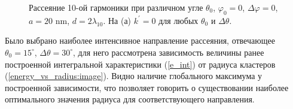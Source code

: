 
    \begin{figure}[H]
        \hfil
        \caption{Рассеяние 10-ой гармоники при различном угле $\theta_0$, $\varphi_0 = 0$, $\Delta \varphi = 0$, $a = 20$ nm, $d = 2\lambda_{10}$. На (а) $k^\prime = 0$ для любых $\theta_0$ и $\Delta \theta$.}\label{theta0_dphi:image}
    \end{figure}


Было выбрано наиболее интенсивное направление рассеяния, отвечающее $\theta_0 = 15^\circ$, $\Delta \theta = 30^\circ$, для него рассмотрена зависимость величины ранее построенной интегральной характеристики (\ref{e_int}) от радиуса кластеров (\autoref{energy_vs_radius:image}). Видно наличие глобального максимума у построенной зависимости, что позволяет говорить о существовании наиболее оптимального значения радиуса для соответствующего направления. 



